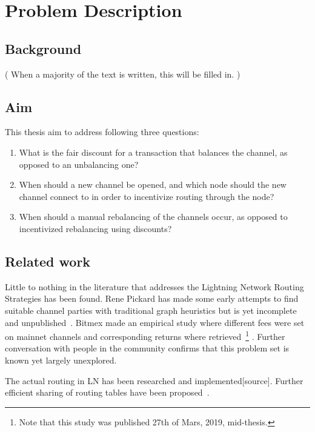 \chapter{Problem Description}

\section{Background}
    \label{sec:background}

	( When a majority of the text is written, this will be filled in. )

\section{Aim}
    \label{sec:aim}

This thesis aim to address following three questions:

    \begin{enumerate}
	\item What is the fair discount for a transaction that balances the channel, as
		opposed to an unbalancing one?
	\item When should a new channel be opened, and which node should the new
		channel connect to in order to incentivize routing through the node?
	\item When should a manual rebalancing of the channels occur, as opposed to
		incentivized rebalancing using discounts?
    \end{enumerate}

\section{Related work}
    \label{sec:related_work}

	Little to nothing in the literature that addresses the Lightning Network Routing Strategies has been found. Rene Pickard has made some early attempts to find suitable channel parties with traditional graph heuristics but is yet incomplete and unpublished~\cite{repository:rene:pickard}. Bitmex made an empirical study where different fees were set on mainnet channels and corresponding returns where retrieved~\cite{bitmex:fee}\footnote{Note that this study was published 27th of Mars, 2019, mid-thesis.} . Further conversation with people in the community confirms that this problem set is known yet largely unexplored.
	
	The actual routing in LN has been researched\cite{distasi:avallone:cononico:routing} and implemented[source]. Further efficient sharing of routing tables have been proposed~\cite{gunspan:marco:ant}.
	
